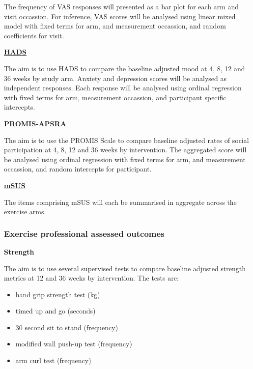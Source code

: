 \documentclass[
]{article}
\providecommand{\tightlist}{%
  \setlength{\itemsep}{0pt}\setlength{\parskip}{0pt}}
\begin{document}
The frequency of VAS responses will presented as a bar plot for each arm and visit occassion.
For inference, VAS scores will be analysed using linear mixed model with fixed terms for arm, and measurement occassion, and random coefficients for visit.


\label{analysis:hads}
\hyperref[outcome:hads]{\textbf{HADS}}

The aim is to use HADS to compare the baseline adjusted mood at 4, 8, 12 and 36 weeks by study arm.
Anxiety and depression scores will be analysed as independent responses.
Each response will be analysed using ordinal regression with fixed terms for arm, measurement occassion, and participant specific intercepts.


\label{analysis:promis-aspra}
\hyperref[outcome:promis-apsra]{\textbf{PROMIS-APSRA}}

The aim is to use the PROMIS Scale to compare baseline adjusted rates of social participation at 4, 8, 12 and 36 weeks by intervention.
The aggregated score will be analysed using ordinal regression with fixed terms for arm, and measurement occassion, and random intercepts for participant.


\label{analysis:msus}
\hyperref[outcome:msus]{\textbf{mSUS}}

The items comprising mSUS will each be summarised in aggregate across the exercise arms.


\hypertarget{exercise-professional-assessed-outcomes}{%
  \subsubsection{Exercise professional assessed outcomes}\label{exercise-professional-assessed-outcomes}}


\textbf{Strength}

The aim is to use several supervised tests to compare baseline adjusted strength metrics at 12 and 36 weeks by intervention.
The tests are:

\begin{itemize}
  \tightlist
  \item hand grip strength test (kg)
  \item timed up and go (seconds)
  \item 30 second sit to stand (frequency)
  \item modified wall push-up test (frequency)
  \item arm curl test (frequency)

\end{itemize}
\end{document}
